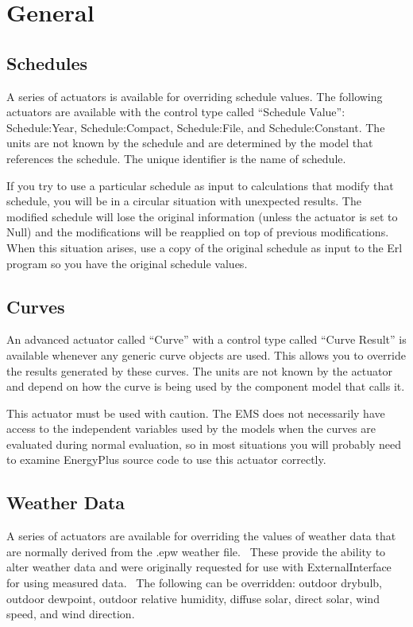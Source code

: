\section{General}\label{general}

\subsection{Schedules}\label{schedules}

A series of actuators is available for overriding schedule values. The following actuators are available with the control type called ``Schedule Value'':~ Schedule:Year, Schedule:Compact, Schedule:File, and Schedule:Constant. The units are not known by the schedule and are determined by the model that references the schedule. The unique identifier is the name of schedule.

If you try to use a particular schedule as input to calculations that modify that schedule, you will be in a circular situation with unexpected results. The modified schedule will lose the original information (unless the actuator is set to Null) and the modifications will be reapplied on top of previous modifications. When this situation arises, use a copy of the original schedule as input to the Erl program so you have the original schedule values.

\subsection{Curves}\label{curves}

An advanced actuator called ``Curve'' with a control type called ``Curve Result'' is available whenever any generic curve objects are used. This allows you to override the results generated by these curves. The units are not known by the actuator and depend on how the curve is being used by the component model that calls it.

This actuator must be used with caution. The EMS does not necessarily have access to the independent variables used by the models when the curves are evaluated during normal evaluation, so in most situations you will probably need to examine EnergyPlus source code to use this actuator correctly.

\subsection{Weather Data}\label{weather-data}

A series of actuators are available for overriding the values of weather data that are normally derived from the .epw weather file.~ These provide the ability to alter weather data and were originally requested for use with ExternalInterface for using measured data.~ The following can be overridden: outdoor drybulb, outdoor dewpoint, outdoor relative humidity, diffuse solar, direct solar, wind speed, and wind direction.
